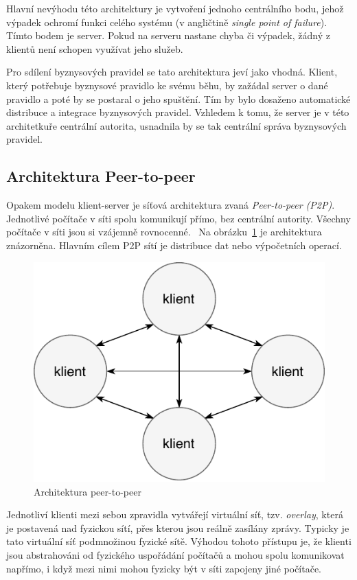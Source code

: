 Hlavní nevýhodu této architektury je vytvoření jednoho centrálního bodu,
jehož výpadek ochromí funkci celého systému (v angličtině
\textit{single point of failure}). Tímto bodem je server.
Pokud na serveru nastane chyba či výpadek, žádný z klientů není schopen využívat
jeho služeb.

Pro sdílení byznysových pravidel se tato architektura jeví
jako vhodná. Klient, který potřebuje byznysové pravidlo ke
svému běhu, by zažádal server o dané pravidlo a poté by
se postaral o jeho spuštění. Tím by bylo dosaženo automatické
distribuce a integrace byznysových pravidel. Vzhledem k tomu,
že server je v této architetkuře centrální autorita, usnadnila
by se tak centrální správa byznysových pravidel.

\subsection{Architektura Peer-to-peer}\label{sec:p2p}

Opakem modelu klient-server je síťová architektura zvaná \textit{Peer-to-peer (\gls{P2P})}.
Jednotlivé počítače v síti spolu komunikují přímo, bez centrální autority.
Všechny počítače v síti jsou si vzájemně rovnocenné.~\cite{fox2001peer}
Na obrázku~\ref{fig:peer-to-peer} je architektura znázorněna.
Hlavním cílem \gls{P2P} sítí je distribuce dat nebo výpočetních operací.

\begin{figure}[t]
    \centering
    \includegraphics[keepaspectratio=true, width=0.4\linewidth]{figures/peer-to-peer.pdf}
    \caption{Architektura peer-to-peer}
    \label{fig:peer-to-peer}
\end{figure}

Jednotliví klienti mezi sebou zpravidla vytvářejí virtuální síť, tzv. \textit{overlay},
která je postavená nad fyzickou sítí, přes kterou jsou reálně zasílány zprávy.
Typicky je tato virtuální síť podmnožinou fyzické sítě. Výhodou tohoto přístupu je,
že klienti jsou abstrahováni od fyzického uspořádání počítačů a mohou spolu komunikovat napřímo,
i když mezi nimi mohou fyzicky být v síti zapojeny jiné počítače.

